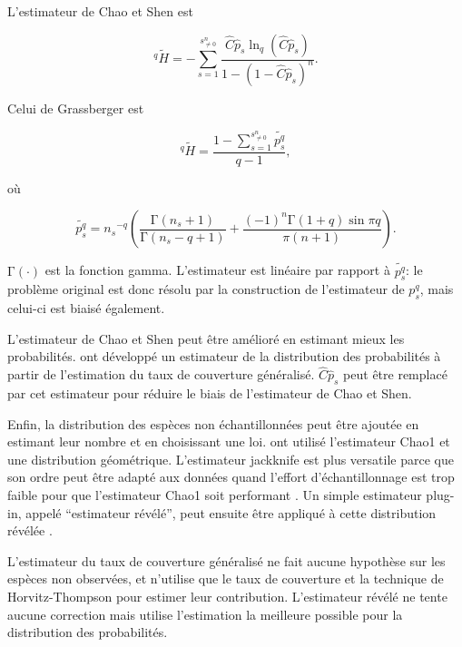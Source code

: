 \documentclass[
  11pt,
  french,
  a4paper,
  extrafontsizes,onecolumn,openright
  ]{memoir}
\newlength{\rf}
\begin{document}
L'estimateur de Chao et Shen est

\begin{equation}
  \label{eq:HqChaoShen}
  ^q\!{\tilde{H}} =-\sum^{s^{n}_{\ne 0}}_{s=1}{\frac{\hat{C}{\hat{p}}_s \ln_q\left(\hat{C}{\hat{p}}_s\right)}{1-{\left(1-\hat{C}{\hat{p}}_s\right)}^n}}.
\end{equation}

Celui de Grassberger est

\begin{equation}
  \label{eq:Grassberger}
  ^q\!{\tilde{H}}
  = \frac{1-\sum^{s^{n}_{\ne 0}}_{s=1}{\widetilde{p^q_s}}}{q-1},
\end{equation}

où

\begin{equation}
  \label{eq:Estpqs}
  \widetilde{p^q_s}
  = {n_s}^{-q} \left(
    \frac{\mathrm{\Gamma}\left(n_s +1\right)}{\mathrm{\Gamma}\left(n_s -q+1\right)}
    + \frac{{\left(-1\right)}^n \mathrm{\Gamma}\left(1+q\right)\sin{\pi q}}{\pi\left(n+1\right)}  \right).
\end{equation}

\(\mathrm{\Gamma}\left(\cdot\right)\) est la fonction gamma.
L'estimateur est linéaire par rapport à \(\widetilde{p^q_s}\): le problème original est donc résolu par la construction de l'estimateur de \(p^q_s\), mais celui-ci est biaisé également.

L'estimateur de Chao et Shen peut être amélioré \autocite{Marcon2015a} en estimant mieux les probabilités.
\textcite{Chao2014c} ont développé un estimateur de la distribution des probabilités à partir de l'estimation du taux de couverture généralisé.
\(\hat{C}{\hat{p}}_s\) peut être remplacé par cet estimateur pour réduire le biais de l'estimateur de Chao et Shen.

Enfin, la distribution des espèces non échantillonnées peut être ajoutée en estimant leur nombre et en choisissant une loi.
\textcite{Chao2014c} ont utilisé l'estimateur Chao1 et une distribution géométrique.
L'estimateur jackknife \autocite{Burnham1979} est plus versatile parce que son ordre peut être adapté aux données quand l'effort d'échantillonnage est trop faible pour que l'estimateur Chao1 soit performant \autocite{Brose2003}.
Un simple estimateur plug-in, appelé ``estimateur révélé'', peut ensuite être appliqué à cette distribution révélée \autocite{Marcon2015a}.

L'estimateur du taux de couverture généralisé ne fait aucune hypothèse sur les espèces non observées, et n'utilise que le taux de couverture et la technique de Horvitz-Thompson pour estimer leur contribution.
L'estimateur révélé ne tente aucune correction mais utilise l'estimation la meilleure possible pour la distribution des probabilités.
\end{document}
